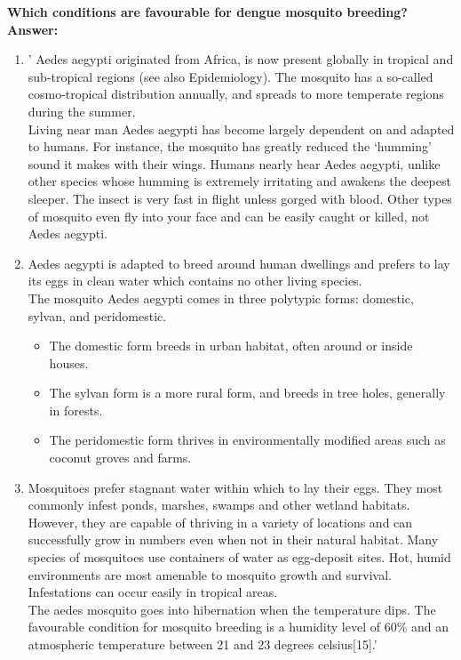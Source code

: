 \documentclass[11pt]{exam}
\begin{document}
\begin{questions}

\newpage
\question
\label{8. Dengue: Favourable habitats }
\textbf{ Which conditions are favourable for dengue mosquito breeding?}\\
\textbf{Answer:}\\
\begin{enumerate}
\item ' Aedes aegypti originated from Africa, is now present globally in tropical and sub-tropical regions (see also Epidemiology). The mosquito has a so-called cosmo-tropical distribution annually, and spreads to more temperate regions during the summer. \\
Living near man Aedes aegypti has become largely dependent on and adapted to humans. For instance, the mosquito has greatly reduced the `humming' sound it makes with their wings. Humans nearly hear Aedes aegypti, unlike other species whose humming is extremely irritating and awakens the deepest sleeper. The insect is very fast in flight unless gorged with blood. Other types of mosquito even fly into your face and can be easily caught or killed, not Aedes aegypti.\\

\item Aedes aegypti is adapted to breed around human dwellings and prefers to lay its eggs in clean water which contains no other living species. \\
The mosquito Aedes aegypti comes in three polytypic forms: domestic, sylvan, and peridomestic.\\
\begin{itemize}
\item The domestic form breeds in urban habitat, often around or inside houses.
\item The sylvan form is a more rural form, and breeds in tree holes, generally in forests.
\item The peridomestic form thrives in environmentally modified areas such as coconut groves and farms.\\
\end{itemize}

\item Mosquitoes prefer stagnant water within which to lay their eggs. They most commonly infest ponds, marshes, swamps and other wetland habitats. However, they are capable of thriving in a variety of locations and can successfully grow in numbers even when not in their natural habitat. Many species of mosquitoes use containers of water as egg-deposit sites.
Hot, humid environments are most amenable to mosquito growth and survival. Infestations can occur easily in tropical areas. \\ %
The aedes mosquito goes into hibernation when the temperature dips. The favourable condition for mosquito breeding is a humidity level of 60\% and an atmospheric temperature between 21 and 23 degrees celsius[15].'\\


\end{enumerate}
\end{questions}
\end{document}
